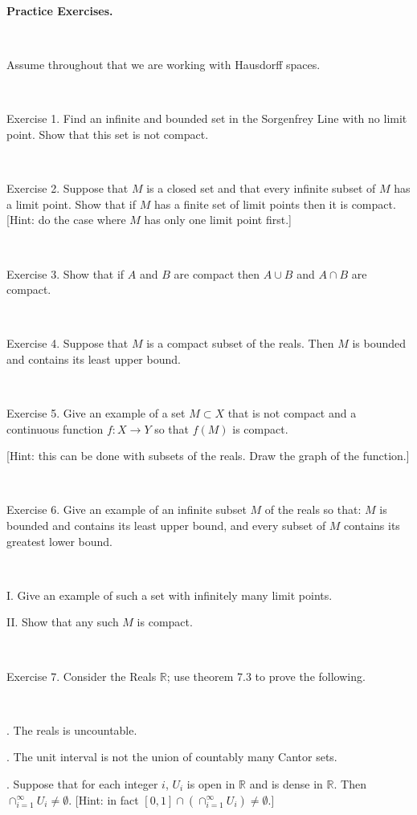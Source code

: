 \documentclass[12pt, std]{article}
\begin{document}
\begin{center} \textbf{Practice Exercises.} \end{center}

\

Assume throughout that we are working
with Hausdorff spaces.

\

Exercise 1. Find an infinite and bounded set in the Sorgenfrey Line with no
limit point.  Show that this set is not compact.

\

Exercise 2. Suppose that $M$ is a closed set and that every infinite
subset of $M$ has a limit point.  Show that if $M$ has a finite set
of limit points then it is compact.  [Hint: do the case where $M$
has only one limit point first.]

\

Exercise 3.  Show that if $A$ and $B$ are compact then $A \cup B$
and $A \cap B$ are compact.  

\

Exercise 4.  Suppose that $M$ is a compact subset of the reals. Then
$M$ is bounded and contains its least upper bound.

\

Exercise 5.  Give an example of a set $M \subset X$ that is not
compact and a continuous function $f: X \rightarrow Y$ so that $f(M)$ is
compact.

[Hint: this can be done with subsets of the reals.  Draw the graph of the function.]

\

Exercise 6. Give an example of an infinite subset $M$ of the
reals so that: $M$ is bounded and contains its least upper bound, and every subset of $M$ contains its greatest lower bound.

\

I. Give an example of such a set with infinitely many limit points.

II. Show that any such $M$ is compact.

\


Exercise 7.  Consider the Reals $\mathbb{R}$; use theorem 7.3 to prove the following.

\

.  The reals is uncountable.


.  The unit interval is not the union of countably many
Cantor sets.

.  Suppose that for each integer $i$, $U_i$ is open in $\mathbb{R}$ and is dense in $\mathbb{R}$.   Then $\cap_{i=1}^\infty U_i \ne \emptyset$.  [Hint: in fact  $[0,1] \cap (\cap_{i=1}^\infty U_i) \ne \emptyset$.]
\end{document}
